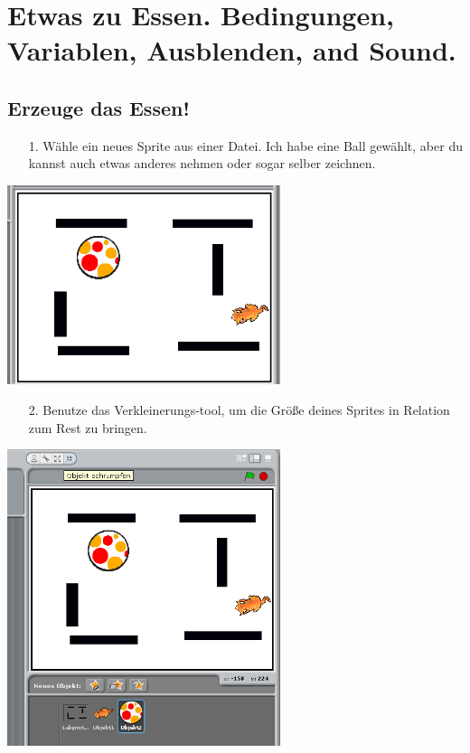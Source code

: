 \section{Etwas zu Essen. Bedingungen, Variablen, Ausblenden, and Sound.}

\subsection{Erzeuge das Essen!}
\begin{itemize}

\item[1.] Wähle ein neues Sprite aus einer Datei. Ich habe eine Ball gewählt, aber du kannst auch etwas anderes nehmen oder sogar selber zeichnen.
\end{itemize}
\includegraphics[width=0.6\textwidth]{images/aufgabe3_uebersicht.png}
\begin{itemize}
\item[2.] Benutze das Verkleinerungs-tool, um die Größe deines Sprites in Relation zum Rest zu bringen.
\end{itemize}
\includegraphics[width=0.6\textwidth]{images/aufgabe3_schrumpfen.png} \newline
